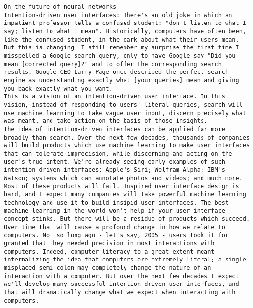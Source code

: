 \begin{lstlisting}
On the future of neural networks
Intention-driven user interfaces: There's an old joke in which an impatient professor tells a confused student: "don't listen to what I say; listen to what I mean". Historically, computers have often been, like the confused student, in the dark about what their users mean. But this is changing. I still remember my surprise the first time I misspelled a Google search query, only to have Google say "Did you mean [corrected query]?" and to offer the corresponding search results. Google CEO Larry Page once described the perfect search engine as understanding exactly what [your queries] mean and giving you back exactly what you want.
This is a vision of an intention-driven user interface. In this vision, instead of responding to users' literal queries, search will use machine learning to take vague user input, discern precisely what was meant, and take action on the basis of those insights.
The idea of intention-driven interfaces can be applied far more broadly than search. Over the next few decades, thousands of companies will build products which use machine learning to make user interfaces that can tolerate imprecision, while discerning and acting on the user's true intent. We're already seeing early examples of such intention-driven interfaces: Apple's Siri; Wolfram Alpha; IBM's Watson; systems which can annotate photos and videos; and much more.
Most of these products will fail. Inspired user interface design is hard, and I expect many companies will take powerful machine learning technology and use it to build insipid user interfaces. The best machine learning in the world won't help if your user interface concept stinks. But there will be a residue of products which succeed. Over time that will cause a profound change in how we relate to computers. Not so long ago - let's say, 2005 - users took it for granted that they needed precision in most interactions with computers. Indeed, computer literacy to a great extent meant internalizing the idea that computers are extremely literal; a single misplaced semi-colon may completely change the nature of an interaction with a computer. But over the next few decades I expect we'll develop many successful intention-driven user interfaces, and that will dramatically change what we expect when interacting with computers.

\end{lstlisting}
